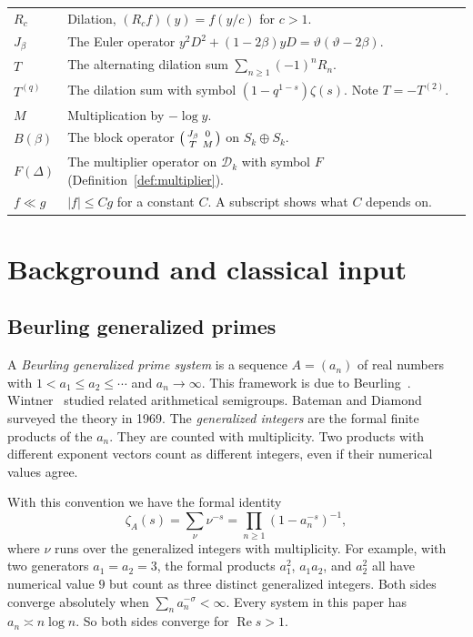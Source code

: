 \documentclass[12pt,letterpaper]{article}
\theoremstyle{definition}
\theoremstyle{remark}
\numberwithin{equation}{section}
\newcommand{\Ree}{\operatorname{Re}}
\newcommand{\Dk}{\mathcal{D}_k}
\newcommand{\yD}{\vartheta}
\begin{document}
\begin{longtable}{@{}p{}p{}@{}}
$R_c$ & Dilation, $(R_cf)(y)=f(y/c)$ for $c>1$.\\
$J_\beta$ & The Euler operator $y^2D^2+(1-2\beta)yD=\yD(\yD-2\beta)$.\\
$T$ & The alternating dilation sum $\sum_{n\ge1}(-1)^nR_n$.\\
$T^{(q)}$ & The dilation sum with symbol $(1-q^{1-s})\zeta(s)$. Note
$T=-T^{(2)}$.\\
$M$ & Multiplication by $-\log y$.\\
$B(\beta)$ & The block operator $\begin{psmallmatrix}J_\beta&0\\
T&M\end{psmallmatrix}$ on $S_k\oplus S_k$.\\
$F(\Delta)$ & The multiplier operator on $\Dk$ with symbol $F$
(Definition~\ref{def:multiplier}).\\
$f\ll g$ & $|f|\le Cg$ for a constant $C$. A subscript shows what $C$
depends on.\\
\bottomrule
\end{longtable}


\section{Background and classical input}\label{sec:background}

\subsection{Beurling generalized primes}

A \emph{Beurling generalized prime system} is a sequence $A=(a_n)$ of real
numbers with $1<a_1\le a_2\le\cdots$ and $a_n\to\infty$. This framework is
due to Beurling~\cite{Be37}. Wintner~\cite{Wi44} studied related
arithmetical semigroups. Bateman and Diamond~\cite{BD69} surveyed the
theory in 1969. The \emph{generalized integers} are the formal finite products
of the $a_n$. They are counted with multiplicity. Two products with
different exponent vectors count as different integers, even if their
numerical values agree.

With this convention we have the formal identity
\[
\zeta_A(s)=\sum_{\nu}\nu^{-s}=\prod_{n\ge1}(1-a_n^{-s})^{-1},
\]
where $\nu$ runs over the generalized integers with multiplicity. For example, with two generators $a_1=a_2=3$, the formal products
$a_1^2$, $a_1a_2$, and $a_2^2$ all have numerical value $9$ but count
as three distinct generalized integers.
Both sides converge absolutely when $\sum_n a_n^{-\sigma}<\infty$. Every system
in this paper has $a_n\asymp n\log n$. So both sides converge for
$\Ree s>1$.
\end{document}
